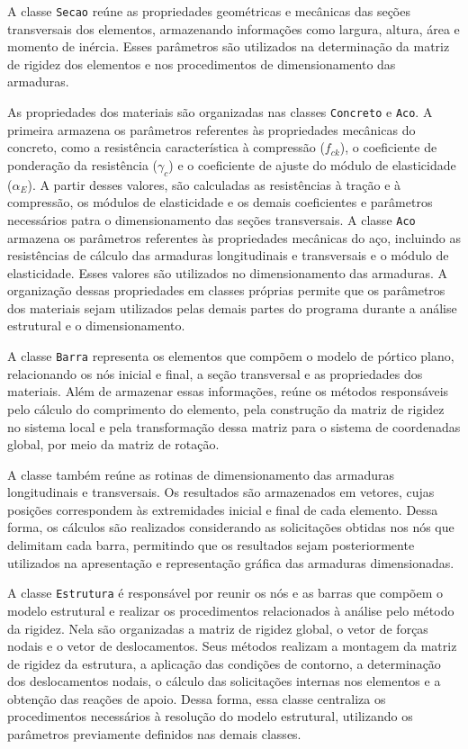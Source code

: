 A classe \texttt{Secao} reúne as propriedades geométricas e mecânicas das seções transversais dos elementos, armazenando informações como largura, altura, área e momento de inércia. Esses parâmetros são utilizados na determinação da matriz de rigidez dos elementos e nos procedimentos de dimensionamento das armaduras.

As propriedades dos materiais são organizadas nas classes \texttt{Concreto} e \texttt{Aco}. A primeira armazena os parâmetros referentes às propriedades mecânicas do concreto, como a resistência característica à compressão (\(f_{ck}\)), o coeficiente de ponderação da resistência (\(\gamma_c\)) e o coeficiente de ajuste do módulo de elasticidade (\(\alpha_E\)). A partir desses valores, são calculadas as resistências à tração e à compressão, os módulos de elasticidade e os demais coeficientes e parâmetros necessários patra o dimensionamento das seções transversais. A classe \texttt{Aco} armazena os parâmetros referentes às propriedades mecânicas do aço, incluindo as resistências de cálculo das armaduras longitudinais e transversais e o módulo de elasticidade. Esses valores são utilizados no dimensionamento das armaduras. A organização dessas propriedades em classes próprias permite que os parâmetros dos materiais sejam utilizados pelas demais partes do programa durante a análise estrutural e o dimensionamento.

A classe \texttt{Barra} representa os elementos que compõem o modelo de pórtico plano, relacionando os nós inicial e final, a seção transversal e as propriedades dos materiais. Além de armazenar essas informações, reúne os métodos responsáveis pelo cálculo do comprimento do elemento, pela construção da matriz de rigidez no sistema local e pela transformação dessa matriz para o sistema de coordenadas global, por meio da matriz de rotação.

A classe também reúne as rotinas de dimensionamento das armaduras longitudinais e transversais. Os resultados são armazenados em vetores, cujas posições correspondem às extremidades inicial e final de cada elemento. Dessa forma, os cálculos são realizados considerando as solicitações obtidas nos nós que delimitam cada barra, permitindo que os resultados sejam posteriormente utilizados na apresentação e representação gráfica das armaduras dimensionadas.

A classe \texttt{Estrutura} é responsável por reunir os nós e as barras que compõem o modelo estrutural e realizar os procedimentos relacionados à análise pelo método da rigidez. Nela são organizadas a matriz de rigidez global, o vetor de forças nodais e o vetor de deslocamentos. Seus métodos realizam a montagem da matriz de rigidez da estrutura, a aplicação das condições de contorno, a determinação dos deslocamentos nodais, o cálculo das solicitações internas nos elementos e a obtenção das reações de apoio. Dessa forma, essa classe centraliza os procedimentos necessários à resolução do modelo estrutural, utilizando os parâmetros previamente definidos nas demais classes.


